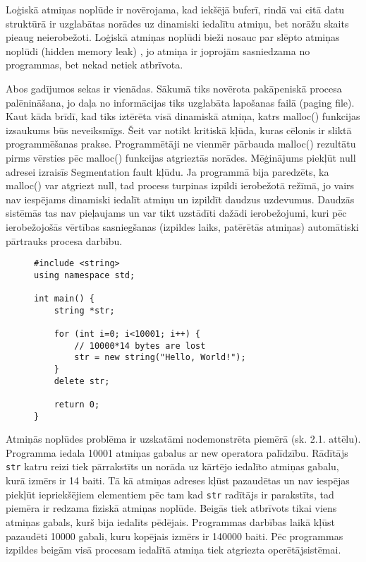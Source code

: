 Loģiskā atmiņas noplūde ir novērojama, kad iekšējā buferī, rindā vai citā datu struktūrā ir uzglabātas norādes uz dinamiski iedalītu atmiņu, bet norāžu skaits pieaug neierobežoti.
Loģiskā atmiņas noplūdi bieži nosauc par slēpto atmiņas noplūdi (hidden memory leak) \cite{RRUU}, jo atmiņa ir joprojām sasniedzama no programmas, bet nekad netiek atbrīvota.

Abos gadījumos sekas ir vienādas.
Sākumā tiks novērota pakāpeniskā procesa palēnināšana, jo daļa no informācijas tiks uzglabāta lapošanas failā (paging file).
Kaut kāda brīdī, kad tiks iztērēta visā dinamiskā atmiņa, katrs malloc() funkcijas izsaukums būs neveiksmīgs.
Šeit var notikt kritiskā kļūda, kuras cēlonis ir sliktā programmēšanas prakse.
Programmētāji ne vienmēr pārbauda malloc() rezultātu pirms vērsties pēc malloc() funkcijas atgrieztās norādes.  
Mēģinājums piekļūt null adresei  izraisīs Segmentation fault kļūdu.
Ja programmā bija paredzēts, ka malloc() var atgriezt null, tad process turpinas izpildi ierobežotā režīmā, jo vairs nav iespējams dinamiski iedalīt atmiņu un izpildīt daudzus uzdevumus. 
Daudzās sistēmās tas nav pieļaujams un var tikt uzstādīti dažādi ierobežojumi, kuri pēc ierobežojošās vērtības sasniegšanas (izpildes laiks, patērētās atmiņas) automātiski pārtrauks procesa darbību. 

\begin{figure}[h]
\begin{lstlisting}
#include <string>
using namespace std;

int main() {
    string *str;

    for (int i=0; i<10001; i++) {
        // 10000*14 bytes are lost
        str = new string("Hello, World!");
    }
    delete str;

    return 0;
}
\end{lstlisting}
\caption{\textbf{\fontsize{11}{12}\selectfont {Atmiņas noplūde, C++}}}
\end{figure}

Atmiņās noplūdes problēma ir uzskatāmi nodemonstrēta piemērā (sk. 2.1. attēlu).
Programma  iedala 10001 atmiņas gabalus ar new operatora palīdzību. 
Rādītājs \texttt{str} katru reizi tiek pārrakstīts un norāda uz kārtējo iedalīto atmiņas gabalu, kurā izmērs ir 14 baiti.
Tā kā atmiņas adreses kļūst pazaudētas un nav iespējas piekļūt iepriekšējiem elementiem pēc tam kad  \texttt{str} radītājs ir parakstīts, tad piemēra ir redzama fiziskā atmiņas noplūde.
Beigās tiek atbrīvots tikai viens atmiņas gabals, kurš bija iedalīts pēdējais. 
Programmas darbības laikā kļūst pazaudēti 10000 gabali, kuru kopējais izmērs ir 140000 baiti.
 Pēc programmas izpildes beigām visā procesam iedalītā atmiņa tiek atgriezta operētājsistēmai.


